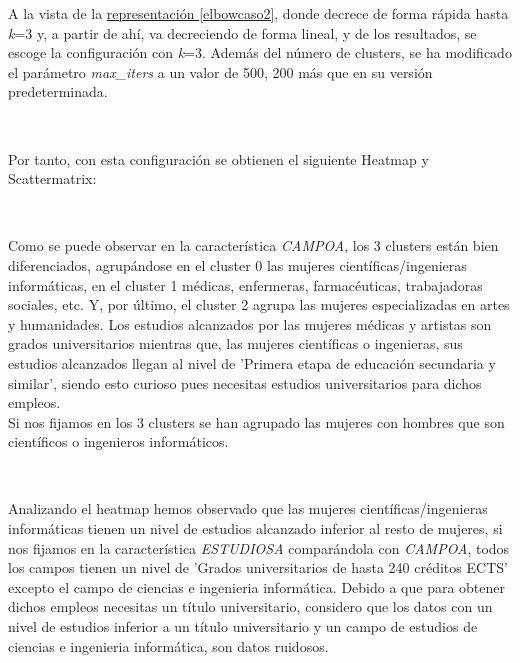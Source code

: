 \documentclass[paper=a4, fontsize=12pt]{article} %
\numberwithin{equation}{section} %
\numberwithin{figure}{section} %
\numberwithin{table}{section} %
\begin{document}
A la vista de la \hyperref [elbowcaso2]{representación \ref*{elbowcaso2}}, donde decrece de forma rápida hasta \textit{k}=3 y, a partir de ahí, va decreciendo de forma lineal, y de los resultados, se escoge la configuración con \textit{k}=3. Además del número de clusters, se ha modificado el parámetro \textit{max\_iters} a un valor de 500, 200 más que en su versión predeterminada.

\begin{figure}[H]
    \centering
    \mbox {
    }
\end{figure}

Por tanto, con esta configuración se obtienen el siguiente Heatmap y Scattermatrix:

\begin{figure}[H]
    \centering
    \mbox {
    }
\end{figure}

Como se puede observar en la característica \textit{CAMPOA}, los 3 clusters están bien diferenciados, agrupándose en el cluster 0 las mujeres científicas/ingenieras informáticas, en el cluster 1 médicas, enfermeras, farmacéuticas, trabajadoras sociales, etc. Y, por último, el cluster 2 agrupa las mujeres especializadas en artes y humanidades. Los estudios alcanzados por las mujeres médicas y artistas son grados universitarios mientras que, las mujeres científicas o ingenieras, sus estudios alcanzados llegan al nivel de 'Primera etapa de educación secundaria y similar', siendo esto curioso pues necesitas estudios universitarios para dichos empleos. \\

Si nos fijamos en los 3 clusters se han agrupado las mujeres con hombres que son científicos o ingenieros informáticos.

\begin{figure}[H]
    \centering
    \mbox {
    }
\end{figure}

Analizando el heatmap hemos observado que las mujeres científicas/ingenieras informáticas tienen un nivel de estudios alcanzado inferior al resto de mujeres, si nos fijamos en la característica \textit{ESTUDIOSA} comparándola con \textit{CAMPOA}, todos los campos tienen un nivel de 'Grados universitarios de hasta 240 créditos ECTS' excepto el campo de ciencias e ingenieria informática. Debido a que para obtener dichos empleos necesitas un título universitario, considero que los datos con un nivel de estudios inferior a un título universitario y un campo de estudios de ciencias e ingenieria informática, son datos ruidosos. \\
\end{document}

